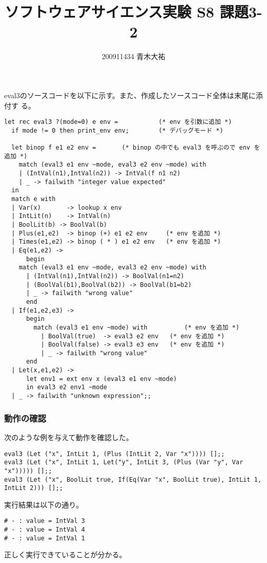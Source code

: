 \documentclass[a4paper,9pt]{jarticle}
\title{ソフトウェアサイエンス実験 S8 課題3-2}
\author{200911434 青木大祐}
\begin{document}
\maketitle
\setcounter{section}{3}
\setcounter{subsection}{2}

\newpage
eval3のソースコードを以下に示す。また、作成したソースコード全体は末尾に添付す
る。

\begin{lstlisting}
let rec eval3 ?(mode=0) e env =           (* env を引数に追加 *)
  if mode != 0 then print_env env;        (* デバッグモード *)

  let binop f e1 e2 env =       (* binop の中でも eval3 を呼ぶので env を追加 *)
    match (eval3 e1 env ~mode, eval3 e2 env ~mode) with
    | (IntVal(n1),IntVal(n2)) -> IntVal(f n1 n2)
    | _ -> failwith "integer value expected"
  in 
  match e with
  | Var(x)       -> lookup x env
  | IntLit(n)    -> IntVal(n)
  | BoolLit(b) -> BoolVal(b)
  | Plus(e1,e2)  -> binop (+) e1 e2 env     (* env を追加 *)
  | Times(e1,e2) -> binop ( * ) e1 e2 env   (* env を追加 *)
  | Eq(e1,e2) ->
      begin
	match (eval3 e1 env ~mode, eval3 e2 env ~mode) with
	  | (IntVal(n1),IntVal(n2)) -> BoolVal(n1=n2)
	  | (BoolVal(b1),BoolVal(b2)) -> BoolVal(b1=b2)
	  | _ -> failwith "wrong value"
      end
  | If(e1,e2,e3) ->
      begin
        match (eval3 e1 env ~mode) with          (* env を追加 *)
          | BoolVal(true)  -> eval3 e2 env   (* env を追加 *)
          | BoolVal(false) -> eval3 e3 env   (* env を追加 *)
          | _ -> failwith "wrong value"
      end
  | Let(x,e1,e2) -> 
      let env1 = ext env x (eval3 e1 env ~mode)
      in eval3 e2 env1 ~mode
  | _ -> failwith "unknown expression";;
\end{lstlisting}

\subsubsection{動作の確認}
次のような例を与えて動作を確認した。

\begin{lstlisting}
eval3 (Let ("x", IntLit 1, (Plus (IntLit 2, Var "x")))) [];;
eval3 (Let ("x", IntLit 1, Let("y", IntLit 3, (Plus (Var "y", Var "x"))))) [];;
eval3 (Let ("x", BoolLit true, If(Eq(Var "x", BoolLit true), IntLit 1, IntLit 2))) [];;
\end{lstlisting}

実行結果は以下の通り。
\begin{lstlisting}
# - : value = IntVal 3
# - : value = IntVal 4
# - : value = IntVal 1
\end{lstlisting}
正しく実行できていることが分かる。
\end{document}
